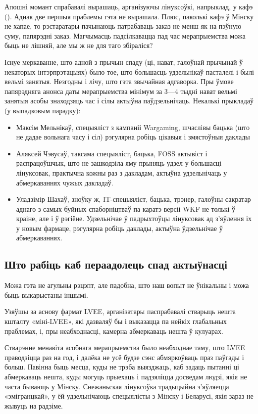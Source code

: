 \documentclass[10pt, a5paper]{article}
\begin{document}
Апошні момант спрабавалі вырашаць, арганізуючы лінуксоўкі, напрыклад, у кафэ (\cite{zack1}). Аднак две першыя праблемы гэта не вырашала. Плюс, паколькі кафэ ў Мінску не хапае, то рэстаратары пачынаюць патрабаваць заказ не менш як на пэўную суму, папярэдні заказ. Магчымасць падсілкавацца пад час мерапрыемства можа быць не лішняй, але мы ж не для таго збіраліся?

Існуе меркаванне, што адной з прычын спаду (ці, нават, галоўнай прычынай ў некаторых інтэрпрэтацыях) было тое, што большасць удзельнікаў пасталелі і былі вельмі занятыя. Незгодны і лічу, што гэта звычайная адгаворка. Пры ўмове папярэдняга анонса даты мерапрыемства мінімум за 3—4 тыдні нават вельмі занятыя асобы знаходзяць час і сілы актыўна паўдзельнічаць. Некалькі прыкладаў (у выпадковым парадку):

\begin{itemize}
  \item {Максім Мельнікаў}, спецыяліст з кампаніі Wargaming, шчаслівы бацька (што не дадае вольнага часу і сіл) рэгулярна робіць цікавыя і змястоўныя даклады
  \item {Аляксей Чэвусаў}, таксама спецыяліст, бацька, FOSS актывіст і распрацоўшчык, што не зашкодзіла яму прыняць удзел у большасці лінуксовак, практычна кожны раз з дакладам, актыўна удзельнічаць у абмеркаваннях чужых дакладаў.
  \item {Уладзімір Шахаў}, зноўку ж, IT-спецыяліст, бацька, трэнер, галоўны сакратар аднаго з самых буйных спаборніцтваў па каратэ версіі WKF не толькі ў краіне, але і ў рэгіёне. Удзельнічае ў падрыхтоўцы лінуксовак ад з'яўлення іх у новым фармаце, рэгулярна робіць даклады, актыўна ўдзельнічае ў абмеркаваннях.
\end{itemize}

\subsection*{Што рабіць каб пераадолець спад актыўнасці}

Можа гэта не агульны рэцэпт, але падобна, што наш вопыт не ўнікальны і можа быць выкарыстаны іншымі.

Узяўшы за аснову фармат LVEE, арганізатары паспрабавалі стварыць нешта кшталту «міні-LVEE», які дазваляў бы і выказацца па нейкіх глабальных праблемах, і, пры неабходнасці, камерна абмеркаваць нешта ў кулуарах.

Стварэнне менавіта асобнага мерапрыемства было неабходнае таму, што LVEE праводзіцца раз на год, і далёка не усё будзе сэнс абмяркоўваць праз паўгады і больш. Павінна быць месца, куды не трэба выязджаць, каб задаць пытанні ці абмеркаваць нешта, куды могуць прыехаць і падзяліцца досведам людзі, якія не часта бываюць у Мінску. Снежаньская лінуксоўка традыцыйна з'яўляецца «эмігранцкай», у ёй удзельнічаюць спецыялісты з Мінску і Беларусі, якія зараз не жывуць на радзіме.
\end{document}
